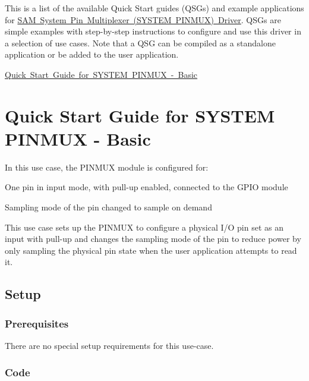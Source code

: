 This is a list of the available Quick Start guides (Q\+S\+Gs) and example applications for \mbox{\hyperlink{group__asfdoc__sam0__system__pinmux__group}{S\+AM System Pin Multiplexer (S\+Y\+S\+T\+EM P\+I\+N\+M\+UX) Driver}}. Q\+S\+Gs are simple examples with step-\/by-\/step instructions to configure and use this driver in a selection of use cases. Note that a Q\+SG can be compiled as a standalone application or be added to the user application.


\begin{DoxyItemize}
\item \mbox{\hyperlink{asfdoc_sam0_system_pinmux_basic_use_case}{Quick Start Guide for S\+Y\+S\+T\+EM P\+I\+N\+M\+UX -\/ Basic}} 
\end{DoxyItemize}\hypertarget{asfdoc_sam0_system_pinmux_basic_use_case}{}\section{Quick Start Guide for S\+Y\+S\+T\+EM P\+I\+N\+M\+UX -\/ Basic}\label{asfdoc_sam0_system_pinmux_basic_use_case}
In this use case, the P\+I\+N\+M\+UX module is configured for\+: \begin{DoxyItemize}
\item One pin in input mode, with pull-\/up enabled, connected to the G\+P\+IO module \item Sampling mode of the pin changed to sample on demand\end{DoxyItemize}
This use case sets up the P\+I\+N\+M\+UX to configure a physical I/O pin set as an input with pull-\/up and changes the sampling mode of the pin to reduce power by only sampling the physical pin state when the user application attempts to read it.\hypertarget{asfdoc_sam0_system_pinmux_basic_use_case_asfdoc_sam0_system_pinmux_basic_use_case_setup}{}\subsection{Setup}\label{asfdoc_sam0_system_pinmux_basic_use_case_asfdoc_sam0_system_pinmux_basic_use_case_setup}
\hypertarget{asfdoc_sam0_system_pinmux_basic_use_case_asfdoc_sam0_system_pinmux_basic_use_case_setup_prereq}{}\subsubsection{Prerequisites}\label{asfdoc_sam0_system_pinmux_basic_use_case_asfdoc_sam0_system_pinmux_basic_use_case_setup_prereq}
There are no special setup requirements for this use-\/case.\hypertarget{asfdoc_sam0_system_pinmux_basic_use_case_asfdoc_sam0_system_pinmux_basic_use_case_setup_code}{}\subsubsection{Code}\label{asfdoc_sam0_system_pinmux_basic_use_case_asfdoc_sam0_system_pinmux_basic_use_case_setup_code}
